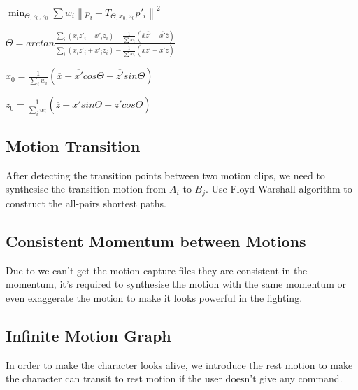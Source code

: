 $\min_{\Theta,z_0,z_0} \sum w_i\left \| p_i-T_{\Theta,x_0,z_0}p'_i \right \|^2$

$\Theta = arctan\frac{\sum_i (x_i z'_i - x'_i z_i)-\frac{1}{\sum w_i}(\overline{x}\overline{z'}-\overline{x'}\overline{z})}
{\sum_i (x_i z'_i + x'_i z_i)-\frac{1}{\sum w_i}(\overline{x}\overline{z'} +\overline{x'}\overline{z})}$

$x_0 = \frac{1}{\sum_i w_i} (\overline{x}-\overline{x'}cos\Theta-\overline{z'}sin\Theta)$

$z_0 = \frac{1}{\sum_i w_i} (\overline{z}+\overline{x'}sin\Theta-\overline{z'}cos\Theta)$

\subsection{Motion Transition}
After detecting the transition points between two motion clips, we need to 
synthesise the transition motion from $A_i$ to $B_j$. 
Use Floyd-Warshall algorithm to construct the all-pairs shortest paths. 





\subsection{Consistent Momentum between Motions}
Due to we can't get the motion capture files they are consistent in the 
momentum, it's required to synthesise the motion with the same momentum or even 
exaggerate the motion to make it looks powerful in the fighting.


\subsection{Infinite Motion Graph}
In order to make the character looks alive, we introduce the rest motion to make 
the character can transit to rest motion if the user doesn't give any command.

